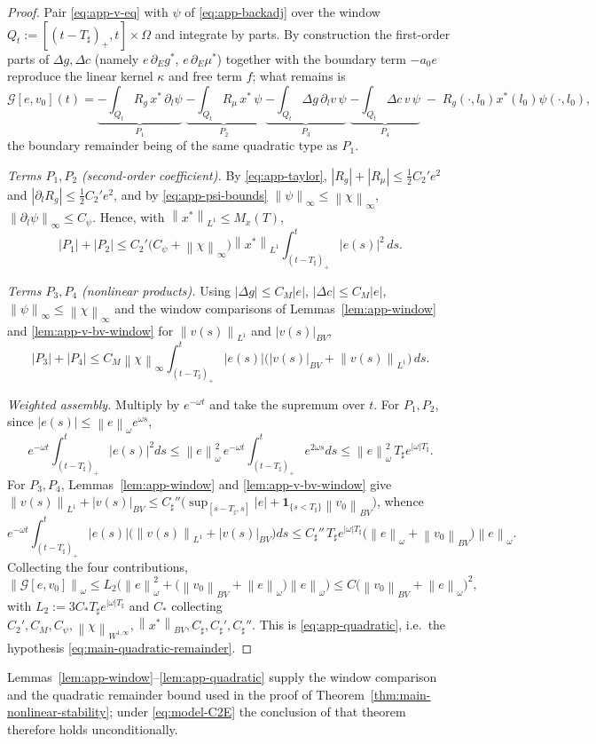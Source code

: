 \documentclass[pdflatex,sn-mathphys-num]{sn-jnl}
\theoremstyle{thmstyleone}
\theoremstyle{definition}
\theoremstyle{remark}
\newcommand{\Om}{\Omega}
\newcommand{\Gcal}{\mathcal{G}}
\newcommand{\norm}[1]{\left\lVert#1\right\rVert}
\newcommand{\abs}[1]{\left\lvert#1\right\rvert}
\numberwithin{equation}{section}
\begin{document}
\begin{proof}
Pair \eqref{eq:app-v-eq} with $\psi$ of \eqref{eq:app-backadj} over the window
$Q_t:=[(t-T_\sharp)_+,t]\times\Om$ and integrate by parts. By construction the
first-order parts of $\Delta g,\Delta c$ (namely $e\,\partial_Eg^*$,
$e\,\partial_E\mu^*$) together with the boundary term $-a_0e$ reproduce the linear
kernel $\kappa$ and free term $f$; what remains is
\[
\Gcal[e,v_0](t)
=\underbrace{-\!\int_{Q_t}\!\!R_g\,x^*\,\partial_l\psi}_{P_1}
\;\underbrace{-\!\int_{Q_t}\!\!R_\mu\,x^*\,\psi}_{P_2}
\;\underbrace{-\!\int_{Q_t}\!\!\Delta g\,\partial_l v\,\psi}_{P_3}
\;\underbrace{-\!\int_{Q_t}\!\!\Delta c\,v\,\psi}_{P_4}
\;-\;R_g(\cdot,l_0)x^*(l_0)\psi(\cdot,l_0),
\]
the boundary remainder being of the same quadratic type as $P_1$.

\emph{Terms $P_1,P_2$ (second-order coefficient).} By \eqref{eq:app-taylor},
$\abs{R_g}+\abs{R_\mu}\le\frac12 C_2'e^2$ and $\abs{\partial_l R_g}\le\frac12
C_2'e^2$, and by \eqref{eq:app-psi-bounds} $\norm{\psi}_\infty\le\norm{\chi}_\infty$,
$\norm{\partial_l\psi}_\infty\le C_\psi$. Hence, with $\norm{x^*}_{L^1}\le M_x(T)$,
\[
\abs{P_1}+\abs{P_2}
\le C_2'\big(C_\psi+\norm{\chi}_\infty\big)\norm{x^*}_{L^1}
\int_{(t-T_\sharp)_+}^{t}\abs{e(s)}^2\,ds .
\]

\emph{Terms $P_3,P_4$ (nonlinear products).} Using $\abs{\Delta g}\le C_M\abs{e}$,
$\abs{\Delta c}\le C_M\abs{e}$, $\norm{\psi}_\infty\le\norm{\chi}_\infty$ and the
window comparisons of Lemmas~\ref{lem:app-window} and
\ref{lem:app-v-bv-window} for $\norm{v(s)}_{L^1}$ and $\abs{v(s)}_{BV}$,
\[
\abs{P_3}+\abs{P_4}
\le C_M\norm{\chi}_\infty
\int_{(t-T_\sharp)_+}^{t}\abs{e(s)}
\Big(\abs{v(s)}_{BV}+\norm{v(s)}_{L^1}\Big)\,ds .
\]

\emph{Weighted assembly.} Multiply by $e^{-\omega t}$ and take the supremum over
$t$. For $P_1,P_2$, since $\abs{e(s)}\le\norm{e}_\omega e^{\omega s}$,
\[
e^{-\omega t}\!\int_{(t-T_\sharp)_+}^{t}\!\abs{e(s)}^2ds
\le \norm{e}_\omega^2\,e^{-\omega t}\!\int_{(t-T_\sharp)_+}^{t}\!e^{2\omega s}ds
\le \norm{e}_\omega^2\,T_\sharp e^{\abs{\omega}T_\sharp}.
\]
For $P_3,P_4$, Lemmas~\ref{lem:app-window} and \ref{lem:app-v-bv-window} give
$\norm{v(s)}_{L^1}+\abs{v(s)}_{BV}\le C_\sharp''\big(\sup_{[s-T_\sharp,s]}\abs{e}
+\mathbf 1_{\{s<T_\sharp\}}\norm{v_0}_{BV}\big)$, whence
\[
e^{-\omega t}\!\int_{(t-T_\sharp)_+}^{t}\!\abs{e(s)}\big(\norm{v(s)}_{L^1}
+\abs{v(s)}_{BV}\big)ds
\le C_\sharp''\,T_\sharp e^{\abs{\omega}T_\sharp}
\big(\norm{e}_\omega+\norm{v_0}_{BV}\big)\norm{e}_\omega .
\]
Collecting the four contributions,
\[
\norm{\Gcal[e,v_0]}_\omega
\le L_2\Big(\norm{e}_\omega^2
+\big(\norm{v_0}_{BV}+\norm{e}_\omega\big)\norm{e}_\omega\Big)
\le C\big(\norm{v_0}_{BV}+\norm{e}_\omega\big)^2,
\]
with $L_2:=3C_*T_\sharp e^{\abs{\omega}T_\sharp}$ and $C_*$ collecting
$C_2',C_M,C_\psi,\norm{\chi}_{W^{1,\infty}},\norm{x^*}_{BV},C_\sharp,C_\sharp',
C_\sharp''$. This is \eqref{eq:app-quadratic}, i.e.\ the hypothesis
\eqref{eq:main-quadratic-remainder}.
\end{proof}

Lemmas~\ref{lem:app-window}--\ref{lem:app-quadratic} supply the window comparison
and the quadratic remainder bound used in the proof of
Theorem~\ref{thm:main-nonlinear-stability}; under \eqref{eq:model-C2E} the
conclusion of that theorem therefore holds unconditionally.


\end{document}
